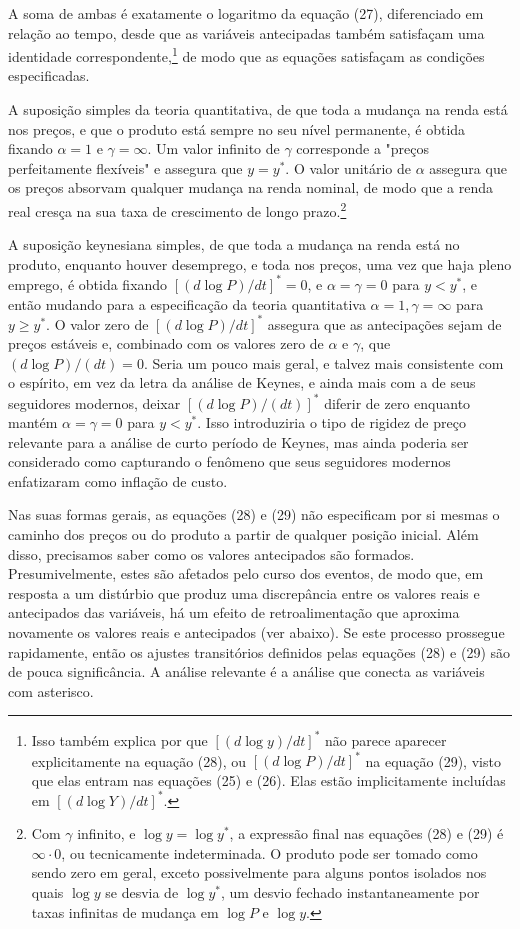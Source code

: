 \documentclass[12pt]{article}
\begin{document}
A soma de ambas é exatamente o logaritmo da equação (27), diferenciado em relação ao tempo, desde que as variáveis antecipadas também satisfaçam uma identidade correspondente,\footnote{Isso também explica por que $[(d \log y)/dt]^*$ não parece aparecer explicitamente na equação (28), ou $[(d \log P)/dt]^*$ na equação (29), visto que elas entram nas equações (25) e (26). Elas estão implicitamente incluídas em $[(d \log Y)/dt]^*$.} de modo que as equações satisfaçam as condições especificadas.

A suposição simples da teoria quantitativa, de que toda a mudança na renda está nos preços, e que o produto está sempre no seu nível permanente, é obtida fixando $\alpha = 1$ e $\gamma = \infty$. Um valor infinito de $\gamma$ corresponde a "preços perfeitamente flexíveis" e assegura que $y = y^*$. O valor unitário de $\alpha$ assegura que os preços absorvam qualquer mudança na renda nominal, de modo que a renda real cresça na sua taxa de crescimento de longo prazo.\footnote{Com $\gamma$ infinito, e $\log y = \log y^*$, a expressão final nas equações (28) e (29) é $\infty \cdot 0$, ou tecnicamente indeterminada. O produto pode ser tomado como sendo zero em geral, exceto possivelmente para alguns pontos isolados nos quais $\log y$ se desvia de $\log y^*$, um desvio fechado instantaneamente por taxas infinitas de mudança em $\log P$ e $\log y$.}

A suposição keynesiana simples, de que toda a mudança na renda está no produto, enquanto houver desemprego, e toda nos preços, uma vez que haja pleno emprego, é obtida fixando $[(d \log P)/dt]^* = 0$, e $\alpha = \gamma = 0$ para $y < y^*$, e então mudando para a especificação da teoria quantitativa $\alpha = 1, \gamma = \infty$ para $y \ge y^*$. O valor zero de $[(d \log P)/dt]^*$ assegura que as antecipações sejam de preços estáveis e, combinado com os valores zero de $\alpha$ e $\gamma$, que $(d \log P)/(dt) = 0$. Seria um pouco mais geral, e talvez mais consistente com o espírito, em vez da letra da análise de Keynes, e ainda mais com a de seus seguidores modernos, deixar $[(d \log P)/(dt)]^*$ diferir de zero enquanto mantém $\alpha = \gamma = 0$ para $y < y^*$. Isso introduziria o tipo de rigidez de preço relevante para a análise de curto período de Keynes, mas ainda poderia ser considerado como capturando o fenômeno que seus seguidores modernos enfatizaram como inflação de custo.

Nas suas formas gerais, as equações (28) e (29) não especificam por si mesmas o caminho dos preços ou do produto a partir de qualquer posição inicial. Além disso, precisamos saber como os valores antecipados são formados. Presumivelmente, estes são afetados pelo curso dos eventos, de modo que, em resposta a um distúrbio que produz uma discrepância entre os valores reais e antecipados das variáveis, há um efeito de retroalimentação que aproxima novamente os valores reais e antecipados (ver abaixo). Se este processo prossegue rapidamente, então os ajustes transitórios definidos pelas equações (28) e (29) são de pouca significância. A análise relevante é a análise que conecta as variáveis com asterisco.
\end{document}
